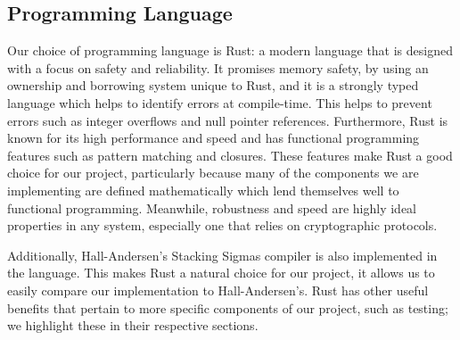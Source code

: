 \subsection{Programming Language}
Our choice of programming language is Rust: a modern 
language that is designed with a focus on safety and reliability.
It promises memory safety, by using an ownership and borrowing
system unique to Rust, and it is a strongly typed language which 
helps to identify errors at compile-time. This helps to prevent errors such 
as integer overflows and null pointer references. Furthermore, 
Rust is known for its high performance and speed \cite{rust-book} and 
has functional programming features such as pattern matching and 
closures. These features make Rust a good choice for our project,
particularly because many of the components we are implementing are 
defined mathematically which lend themselves well to functional 
programming. Meanwhile, robustness and speed are highly ideal properties
in any system, especially one that relies on cryptographic protocols.

Additionally, Hall-Andersen's \cite{MHAStackSig}
Stacking Sigmas compiler is also implemented in the language. This makes 
Rust a natural choice for our project, it allows us to easily compare 
our implementation to Hall-Andersen's. Rust has other useful benefits 
that pertain to more specific components of our project, such as 
testing; we highlight these in their respective sections.

